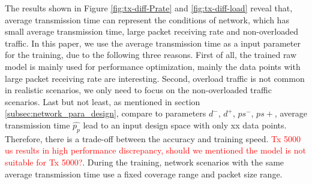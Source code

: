  The results shown in Figure \ref{fig:tx-diff-Prate} and  \ref{fig:tx-diff-load} reveal that, average transmission time can represent the conditions of network, which has small average transmission time, large packet receiving rate and non-overloaded traffic. In this paper, we use the average transmission time as a input parameter for the training, due to the following three reasons. First of all, the trained \gls{raw} model is mainly used for performance optimization, mainly the data points with large packet receiving rate are interesting. Second, overload traffic is not common in realistic scenarios, we only need to focus on the non-overloaded traffic scenarios. Last but not least, as mentioned in section \ref{subsec:network_para_design}, compare to parameters {${d^-}$, ${d^+}$, ${ps^-}$, ${ps+}$}, average transmission time $\hat{p_p}$ lead to an input design space with only xx data points. Therefore, there is a trade-off between the accuracy and training speed. \textcolor{red}{Tx 5000 us results in high performance discrepancy, should we mentioned the model is not suitable for Tx 5000?}. During the training, network scenarios with the same average transmission time use a fixed coverage range and packet size range. 





